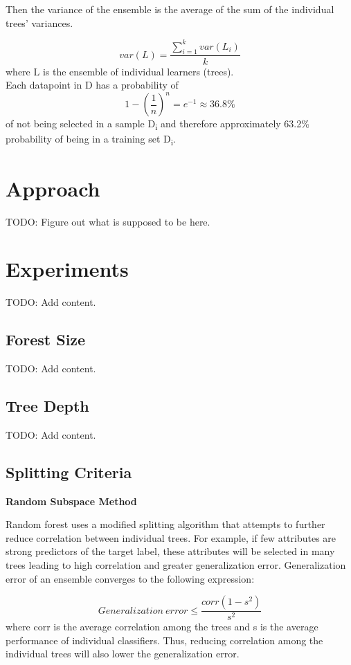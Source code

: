 \documentclass{article} %
\begin{document}
Then the variance of the ensemble is the average of the sum of the individual trees' variances.

\[ var(L) = \frac{\sum_{i=1}^k var(L_i)}{k}\] where L is the ensemble of individual learners (trees).\\

Each datapoint in D has a probability of \[1-\left(\frac{1}{n}\right)^n = e^{-1} \approx 36.8 \% \] of not being selected in  a sample D\textsubscript{i} and therefore approximately 63.2\% probability of being in a training set D\textsubscript{i}.

\section{Approach}
TODO: Figure out what is supposed to be here.

\section{Experiments}
TODO: Add content.

\subsection{Forest Size}
TODO: Add content.

\subsection{Tree Depth}
TODO: Add content.

\subsection{Splitting Criteria}

\textbf{Random Subspace Method}

Random forest uses a modified splitting algorithm that attempts to further reduce correlation between individual trees. For example, if few attributes are strong predictors of the target label, these attributes will be selected in many trees leading to high correlation and greater generalization error.  Generalization error of an ensemble converges to the following expression:

\[Generalization\ error \leq \frac{corr(1-s^2)}{s^2}\] where corr is the average correlation among the trees and s is the average performance of individual classifiers. Thus, reducing correlation among the individual trees will also lower the generalization error.
\end{document}
